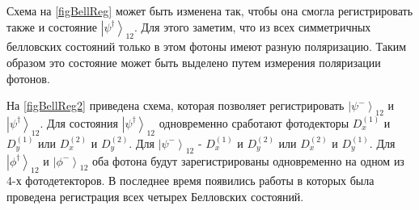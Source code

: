 

Схема на \autoref{figBellReg} может быть изменена так, чтобы она
смогла регистрировать также и состояние
$\left|\psi^{\dag}\right>_{12}$. Для этого заметим, что из всех
симметричных белловских состояний только в этом фотоны имеют разную
поляризацию. Таким образом это состояние может быть выделено путем
измерения поляризации фотонов.

На \autoref{figBellReg2} приведена схема, которая позволяет
регистрировать $\left|\psi^{-}\right>_{12}$ и
$\left|\psi^{\dag}\right>_{12}$. Для состояния
$\left|\psi^{\dag}\right>_{12}$ одновременно сработают фотодекторы 
$D^{(1)}_x$ и $D^{(1)}_y$ или $D^{(2)}_x$ и $D^{(2)}_y$. Для
$\left|\psi^{-}\right>_{12}$ - $D^{(1)}_x$ и $D^{(2)}_y$ или
$D^{(2)}_x$ и $D^{(1)}_y$. Для $\left|\phi^{\dag}\right>_{12}$ и
$\left|\phi^{-}\right>_{12}$ оба фотона будут зарегистрированы
одновременно на одном из 4-х фотодетекторов. В последнее время
появились работы \cite{bKulik} в которых была проведена регистрация
всех четырех Белловских состояний.
